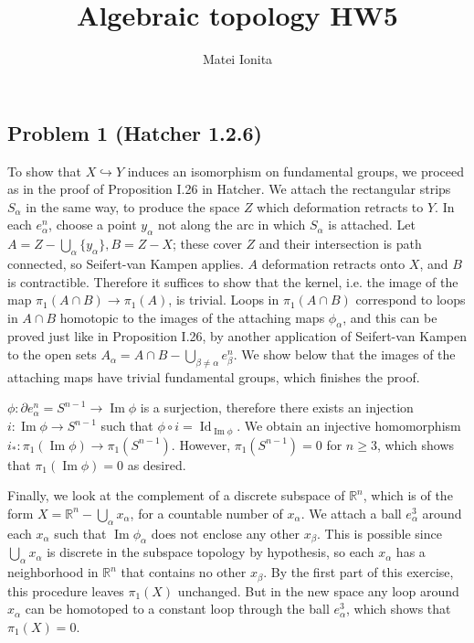 \documentclass[12 pt]{article}
\title{Algebraic topology HW5}
\author{Matei Ionita}
\newcommand{\R}{\mathbb{R}}
\newcommand{\p}{\partial}
\DeclareMathOperator{\id}{Id}
\DeclareMathOperator{\imag}{Im}
\begin{document}
  \maketitle


\subsection*{Problem 1 (Hatcher 1.2.6)}
To show that $X \hookrightarrow Y$ induces an isomorphism on fundamental groups, we proceed as in the proof of Proposition I.26 in Hatcher. We attach the rectangular strips $S_{\alpha}$ in the same way, to produce the space $Z$ which deformation retracts to $Y$. In each $e_{\alpha}^n$, choose a point $y_{\alpha}$ not along the arc in which $S_{\alpha}$ is attached. Let $A = Z - \bigcup_{\alpha} \{y_{\alpha}\}, B = Z - X$; these cover $Z$ and their intersection is path connected, so Seifert-van Kampen applies. $A$ deformation retracts onto $X$, and $B$ is contractible. Therefore it suffices to show that the kernel, i.e. the image of the map $\pi_1(A\cap B) \to \pi_1(A)$, is trivial. Loops in $\pi_1(A\cap B)$ correspond to loops in $A\cap B$ homotopic to the images of the attaching maps $\phi_{\alpha}$, and this can be proved just like in Proposition I.26, by another application of Seifert-van Kampen to the open sets $A_{\alpha} = A\cap B - \bigcup_{\beta \neq \alpha} e_{\beta}^n$. We show below that the images of the attaching maps have trivial fundamental groups, which finishes the proof.

$\phi : \p e_{\alpha}^n = S^{n-1} \to \imag \phi$ is a surjection, therefore there exists an injection $i : \imag \phi \to S^{n-1}$ such that $\phi \circ i = \id_{\imag \phi}$. We obtain an injective homomorphism $i_* : \pi_1(\imag \phi) \to \pi_1(S^{n-1})$. However, $\pi_1(S^{n-1}) = 0$ for $n\geq 3$, which shows that $\pi_1(\imag \phi) = 0$ as desired.

Finally, we look at the complement of a discrete subspace of $\R^n$, which is of the form $X = \R^n - \bigcup_{\alpha} x_{\alpha}$, for a countable number of $x_{\alpha}$. We attach a ball $e_{\alpha}^3$ around each $x_{\alpha}$ such that $\imag \phi_{\alpha}$ does not enclose any other $x_{\beta}$. This is possible since $\bigcup_{\alpha} x_{\alpha}$ is discrete in the subspace topology by hypothesis, so each $x_{\alpha}$ has a neighborhood in $\R^n$ that contains no other $x_{\beta}$. By the first part of this exercise, this procedure leaves $\pi_1(X)$ unchanged. But in the new space any loop around $x_{\alpha}$ can be homotoped to a constant loop through the ball $e_{\alpha}^3$, which shows that $\pi_1(X) = 0$.
\end{document}
